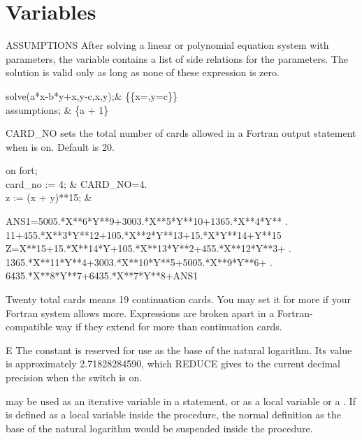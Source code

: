 \newpage
\section{Variables}

\begin{Variable}[assumptions]{ASSUMPTIONS}
After solving a linear or polynomial equation system
with parameters, the variable  contains a list 
of side relations for the parameters. The solution is valid only
as long as none of these expression is zero.
\begin{Examples}
solve({a*x-b*y+x,y-c},{x,y});&
\{\{x=,y=c\}\} \\
assumptions; & \{a + 1\}
\end{Examples}
\end{Variable}


\begin{Variable}[card_no]{CARD_NO}
 sets the total number of cards allowed in a Fortran
output statement when  is on.  Default is 20.

\begin{Examples}
on fort; \\
card_no := 4;                &         CARD_NO=4. \\
z := (x + y)**15;            &
\begin{multilineoutput}{6cm}
      ANS1=5005.*X**6*Y**9+3003.*X**5*Y**10+1365.*X**4*Y**
     . 11+455.*X**3*Y**12+105.*X**2*Y**13+15.*X*Y**14+Y**15
      Z=X**15+15.*X**14*Y+105.*X**13*Y**2+455.*X**12*Y**3+ 
     . 1365.*X**11*Y**4+3003.*X**10*Y**5+5005.*X**9*Y**6+
     . 6435.*X**8*Y**7+6435.*X**7*Y**8+ANS1
\end{multilineoutput}
\end{Examples}

\begin{Comments}
Twenty total cards means 19 continuation cards.  You may set it for more
if your Fortran system allows more.  Expressions are broken apart in a
Fortran-compatible way if they extend for more than 
continuation cards.
\end{Comments}
\end{Variable}


\begin{Constant}[e]{E}
The constant  is reserved for use as the base of the natural
logarithm.  Its value is approximately 2.71828284590, which REDUCE gives
to the current decimal precision when the switch  is on.

\begin{Comments}
 may be used as an iterative variable in a  statement,
or as a local variable or a .  If  is defined
as a local
variable inside the procedure, the normal definition as the base of the
natural logarithm would be suspended inside the procedure.
\end{Comments}
\end{Constant}


